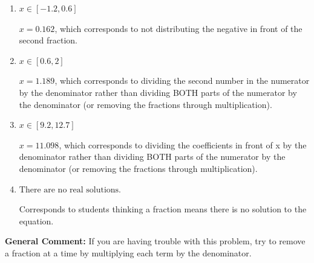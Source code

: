 \documentclass{extbook}[14pt]
\begin{document}
\begin{enumerate}
{\begin{enumerate}[label=\Alph*.]
* $x = 2.474$, which is the correct option.
\item \( x \in [-1.2, 0.6] \)

 $x = 0.162$, which corresponds to not distributing the negative in front of the second fraction.
\item \( x \in [0.6, 2] \)

 $x = 1.189$, which corresponds to dividing the second number in the numerator by the denominator rather than dividing BOTH parts of the numerator by the denominator (or removing the fractions through multiplication).
\item \( x \in [9.2, 12.7] \)

 $x = 11.098$, which corresponds to dividing the coefficients in front of x by the denominator rather than dividing BOTH parts of the numerator by the denominator (or removing the fractions through multiplication).
\item \( \text{There are no real solutions.} \)

Corresponds to students thinking a fraction means there is no solution to the equation.
\end{enumerate}

\textbf{General Comment:} If you are having trouble with this problem, try to remove a fraction at a time by multiplying each term by the denominator.
}
\end{enumerate}
\end{document}
